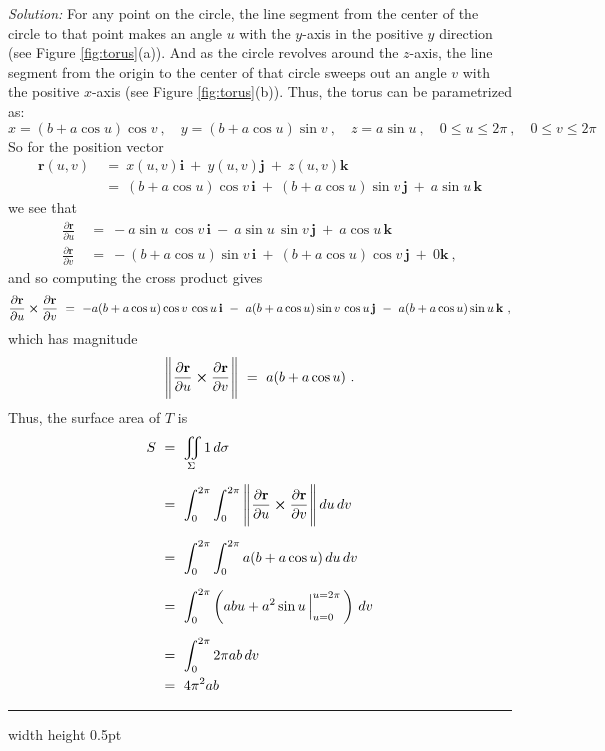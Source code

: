 \begin{exmp}
\par\noindent \emph{Solution:}
For any point on the circle, the line segment from the center of the circle to that point makes an angle $u$ with the
$y$-axis in the positive $y$ direction (see Figure \ref{fig:torus}(a)). And as the circle revolves around the $z$-axis,
the line segment from the origin to the center of that circle sweeps out an angle $v$ with the positive $x$-axis (see
Figure \ref{fig:torus}(b)). Thus, the torus can be parametrized as:
\begin{displaymath}
 x = (b+a\cos u)\cos v ~,\quad y = (b+a\cos u)\sin v ~,\quad z = a\sin u~,\quad 0\le u\le 2\pi~,\quad 0\le v\le 2\pi
\end{displaymath}
So for the position vector
\begin{align*}
 \mathbf{r}(u,v) ~&=~ x(u,v) \mathbf{i} ~+~ y(u,v) \mathbf{j} ~+~ z(u,v) \mathbf{k}\\
 &=~ (b+a\cos u)\cos v \,\mathbf{i} ~+~ (b+a\cos u)\sin v \,\mathbf{j} ~+~ a\sin u \,\mathbf{k}
\end{align*}
we see that
\begin{align*}
 \frac{\partial \mathbf{r}}{\partial u} ~&=~
  -a\sin u\,\cos v \,\mathbf{i} ~-~ a\sin u\,\sin v \,\mathbf{j} ~+~ a\cos u \,\mathbf{k}\\[6pt]
 \frac{\partial \mathbf{r}}{\partial v} ~&=~
  -(b+a\cos u)\sin v \,\mathbf{i} ~+~ (b+a\cos u)\cos v \,\mathbf{j} ~+~ 0 \mathbf{k} ~,
\end{align*}
and so computing the cross product gives
\begin{displaymath}
 \frac{\partial \mathbf{r}}{\partial u} \bm{\times} \frac{\partial \mathbf{r}}{\partial v} ~=~
  -a(b+a\cos u)\cos v\,\cos u \,\mathbf{i} ~-~ a(b+a\cos u)\sin v\,\cos u\,\mathbf{j} ~-~ a(b+a\cos u)\sin u \,\mathbf{k} ~,
\end{displaymath}
which has magnitude
\begin{displaymath}
 \Biggl\lVert\mspace{1mu}\frac{\partial \mathbf{r}}{\partial u} \bm{\times} \frac{\partial \mathbf{r}}{\partial v}\mspace{1mu}\Biggr\rVert ~=~ a(b+a\cos u) ~.
\end{displaymath}
Thus, the surface area of $T$ is
\begin{align*}
 S ~&=~ \iint\limits_{\Sigma} 1\,d\sigma\\[6pt]
  &=~ \int_0^{2\pi} \int_0^{2\pi}\,\Biggl\lVert\mspace{1mu}\frac{\partial \mathbf{r}}{\partial u} \bm{\times} \frac{\partial
  \mathbf{r}}{\partial v}\mspace{1mu}\Biggr\rVert\,du\,dv\\[6pt]
  &=~ \int_0^{2\pi} \int_0^{2\pi} a(b+a\cos u)\,du\,dv\\[6pt]
  &=~ \int_0^{2\pi} \left( abu + a^2 \sin u \,\Big|_{u=0}^{u=2\pi}\,\right)\,dv\\[6pt]
  &=~ \int_0^{2\pi} 2\pi ab\,dv\\
  &=~ 4\pi^2 ab
\end{align*}
\end{exmp}
\hrule width \textwidth height 0.5pt
\medskip



